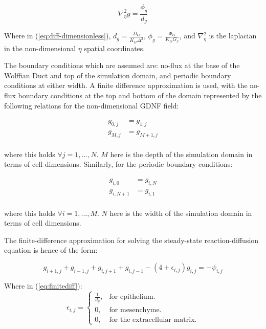 \documentclass[pdftex,10pt,a4paper]{article}
\begin{document}
\begin{equation}\label{eq:diff-dimensionless}
\nabla_\eta^2 g = \frac{\phi_g}{d_g}
\end{equation}

Where in (\ref{eq:diff-dimensionless}), $d_g = \frac{D_G}{K_G \Delta^2}$, $\phi_g = \frac{\Phi_G}{K_G G_x}$, and $\nabla_\eta^2$ is the laplacian in the non-dimensional $\eta$ spatial coordinates.

The boundary conditions which are assumed are: no-flux at the base of the Wolffian Duct and top of the simulation domain, and periodic boundary conditions at either width. A finite difference approximation is used, with the no-flux boundary conditions at the top and bottom of the domain represented by the following relations for the non-dimensional GDNF field:

\begin{align*}
g_{0,j}& = g_{1,j}\\
g_{M,j}& = g_{M+1,j}\\
\end{align*}

where this holds $\forall j = 1,...,N$. $M$ here is the depth of the simulation domain in terms of cell dimensions. Similarly, for the periodic boundary conditions:

\begin{align*}
g_{i,0}& = g_{i,N}\\
g_{i,N+1}& = g_{i,1}\\
\end{align*}

where this holds $\forall i = 1,...,M$. $N$ here is the width of the simulation domain in terms of cell dimensions.

The finite-difference approximation for solving the steady-state reaction-diffusion equation is hence of the form:

\begin{equation}\label{eq:finitediff}
g_{i+1,j} + g_{i-1,j} + g_{i,j+1} + g_{i,j-1} - (4 + \epsilon_{i,j})g_{i,j} = -\psi_{i,j}
\end{equation}

Where in (\ref{eq:finitediff}):
\begin{equation}
\epsilon_{i,j} =\begin{cases}
\frac{1}{d_g}, & \text{for epithelium}.\\
0, & \text{for mesenchyme}.\\
0, & \text{for the extracellular matrix}.
\end{cases}
\end{equation}
\end{document}
